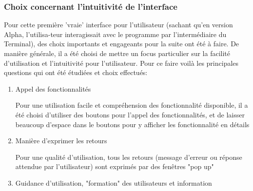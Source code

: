 \subsubsection{Choix concernant l’intuitivité de l’interface}

Pour cette première 'vraie' interface pour l’utilisateur (sachant qu’en version Alpha, l’utilisa-teur interagissait avec le programme par l'intermédiaire du Terminal),
des choix importants et engageants pour la suite ont été à faire. De manière générale,
il a été choisi de mettre un focus particulier sur la facilité d’utilisation et l’intuitivité pour l’utilisateur.
Pour ce faire voilà les principales questions qui ont été étudiées et  choix effectués:

\begin{enumerate}
    \item Appel des fonctionnalités

          Pour une utilisation facile et compréhension des fonctionnalité disponible, il a été choisi
          d'utiliser des boutons pour l’appel des fonctionnalités, et de laisser beaucoup d’espace
          dans le boutons pour y afficher les fonctionnalité en détails
    \item Manière d’exprimer les retours

          Pour une qualité d’utilisation, tous les retours (message d’erreur ou réponse attendue par l’utilisateur)
          sont exprimés par des fenêtres "pop up"
    \item Guidance d’utilisation, "formation" des utilisateurs et information


\end{enumerate}
